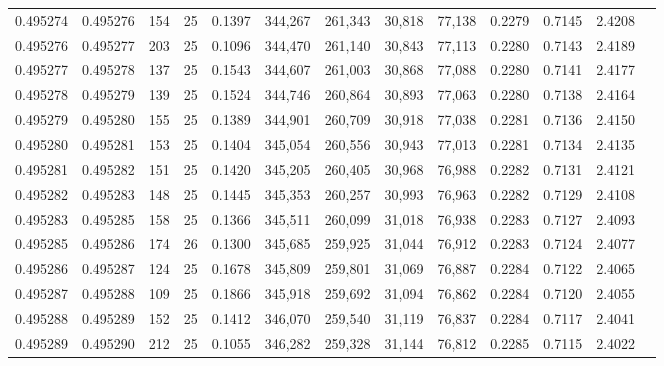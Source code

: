 \begin{tabular}{rrrrrrrrrrrrr}
0.495274 & 0.495276 &   154 &  25 &                                     0.1397 & 344,267 & 261,343 &  30,818 &  77,138 & 0.2279 & 0.7145 & 2.4208 \\
0.495276 & 0.495277 &   203 &  25 &                                     0.1096 & 344,470 & 261,140 &  30,843 &  77,113 & 0.2280 & 0.7143 & 2.4189 \\
0.495277 & 0.495278 &   137 &  25 &                                     0.1543 & 344,607 & 261,003 &  30,868 &  77,088 & 0.2280 & 0.7141 & 2.4177 \\
0.495278 & 0.495279 &   139 &  25 &                                     0.1524 & 344,746 & 260,864 &  30,893 &  77,063 & 0.2280 & 0.7138 & 2.4164 \\
0.495279 & 0.495280 &   155 &  25 &                                     0.1389 & 344,901 & 260,709 &  30,918 &  77,038 & 0.2281 & 0.7136 & 2.4150 \\
0.495280 & 0.495281 &   153 &  25 &                                     0.1404 & 345,054 & 260,556 &  30,943 &  77,013 & 0.2281 & 0.7134 & 2.4135 \\
0.495281 & 0.495282 &   151 &  25 &                                     0.1420 & 345,205 & 260,405 &  30,968 &  76,988 & 0.2282 & 0.7131 & 2.4121 \\
0.495282 & 0.495283 &   148 &  25 &                                     0.1445 & 345,353 & 260,257 &  30,993 &  76,963 & 0.2282 & 0.7129 & 2.4108 \\
0.495283 & 0.495285 &   158 &  25 &                                     0.1366 & 345,511 & 260,099 &  31,018 &  76,938 & 0.2283 & 0.7127 & 2.4093 \\
0.495285 & 0.495286 &   174 &  26 &                                     0.1300 & 345,685 & 259,925 &  31,044 &  76,912 & 0.2283 & 0.7124 & 2.4077 \\
0.495286 & 0.495287 &   124 &  25 &                                     0.1678 & 345,809 & 259,801 &  31,069 &  76,887 & 0.2284 & 0.7122 & 2.4065 \\
0.495287 & 0.495288 &   109 &  25 &                                     0.1866 & 345,918 & 259,692 &  31,094 &  76,862 & 0.2284 & 0.7120 & 2.4055 \\
0.495288 & 0.495289 &   152 &  25 &                                     0.1412 & 346,070 & 259,540 &  31,119 &  76,837 & 0.2284 & 0.7117 & 2.4041 \\
0.495289 & 0.495290 &   212 &  25 &                                     0.1055 & 346,282 & 259,328 &  31,144 &  76,812 & 0.2285 & 0.7115 & 2.4022 \\

\end{tabular}
